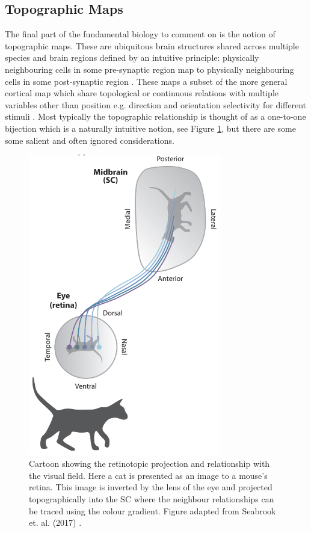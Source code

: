 \subsection{Topographic Maps}
The final part of the fundamental biology to comment on is the notion of topographic maps. These are ubiquitous brain structures shared across multiple species and brain regions defined by an intuitive principle: physically neighbouring cells in some pre-synaptic region map to physically neighbouring cells in some post-synaptic region \cite{Swindale1996-kk, Cang2013-dw}. These maps a subset of the more general cortical map which share topological or continuous relations with multiple variables other than position e.g. direction and orientation selectivity for different stimuli \cite{Bednar2016-lg}. Most typically the topographic relationship is thought of as a one-to-one bijection which is a naturally intuitive notion, see Figure \ref{fig:topographicmap},  but there are some some salient and often ignored considerations.

\begin{figure}[h!]
	\centering
	\includegraphics[width = 0.75\textwidth]{images/introduction/cartoon_topography}
	\def\c{Cartoon showing the retinotopic projection and relationship with the visual field. }
	\caption[\c]{\label{fig:topographicmap} \c Here a cat is presented as an image to a mouse's retina. This image is inverted by the lens of the eye and projected topographically into the SC where the neighbour relationships can be traced using the colour gradient. Figure adapted from Seabrook et. al. (2017) \cite{Seabrook2017-fa}.} 
\end{figure}
